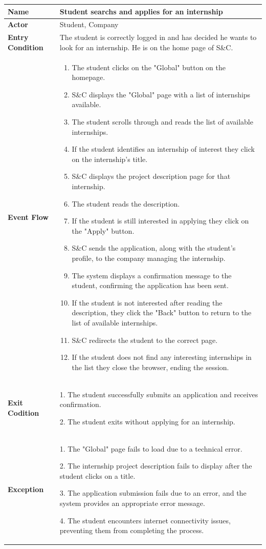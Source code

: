 \begin{longtable}{|p{}|p{}|}
\hline
\textbf{Name} &  Student searchs and applies for an internship\\
\hline
\textbf{Actor} &  Student, Company\\
\hline
\textbf{Entry Condition} &  The student is correctly logged in and has decided he wants to look for an internship. He is on the home page of S\&C.\\
\hline
\textbf{Event Flow} &  
\begin{enumerate}
    \item  The student clicks on the "Global" button on the homepage.
    \item S\&C displays the "Global" page with a list of internships available.
    \item The student scrolls through and reads the list of available internships.
    \item If the student identifies an internship of interest they click on the internship's title.
    \item S\&C displays the project description page for that internship.
    \item The student reads the description.
    \item If the student is still interested in applying they click on the "Apply" button.
    \item S\&C sends the application, along with the student's profile, to the company managing the internship.
    \item The system displays a confirmation message to the student, confirming the application has been sent.
    \item If the student is not interested after reading the description, they click the "Back" button to return to the list of available internships.
    \item S\&C redirects the student to the correct page.
    \item  If the student does not find any interesting internships in the list they close the browser, ending the session.
\end{enumerate} \\
\hline
\textbf{Exit Codition} &  
1. The student successfully submits an application and receives confirmation.

2. The student exits without applying for an internship.\\
\hline
\textbf{Exception} &  
1. The "Global" page fails to load due to a technical error.	

2. The internship project description fails to display after the student clicks on a title.

3. The application submission fails due to an error, and the system provides an appropriate error message.	

4. The student encounters internet connectivity issues, preventing them from completing the process.\\
\hline
\end{longtable}

